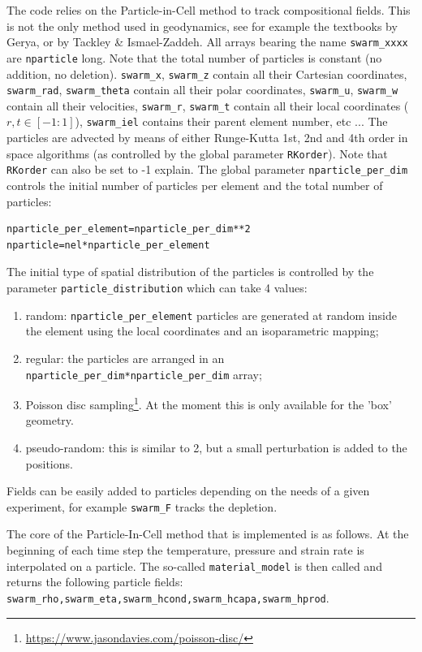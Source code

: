\documentclass[a4paper,12pt]{article}
\begin{document}
The code relies on the Particle-in-Cell method to track compositional fields.
This is not the only method used in geodynamics, see for example 
the textbooks by Gerya, or by Tackley \& Ismael-Zaddeh.
All arrays bearing the name \lstinline{swarm_xxxx} are \lstinline{nparticle} long.
Note that the total number of particles is constant (no addition, no deletion).
\lstinline{swarm_x}, \lstinline{swarm_z} contain all their Cartesian coordinates, 
\lstinline{swarm_rad}, \lstinline{swarm_theta} contain all their polar coordinates, 
\lstinline{swarm_u}, \lstinline{swarm_w} contain all their velocities, 
\lstinline{swarm_r}, \lstinline{swarm_t} contain all their local coordinates ($r,t\in[-1:1]$),
\lstinline{swarm_iel} contains their parent element number, etc ...
The particles are advected by means of either Runge-Kutta 1st, 2nd and 4th order in space
algorithms (as controlled by the global parameter \lstinline{RKorder}).
Note that \lstinline{RKorder} can also be set to -1 {\color{red} explain}.
The global parameter \lstinline{nparticle_per_dim} controls the initial number 
of particles per element and the total number of particles:
\begin{lstlisting}
nparticle_per_element=nparticle_per_dim**2
nparticle=nel*nparticle_per_element
\end{lstlisting}
The initial type of spatial distribution of the particles is controlled 
by the parameter \lstinline{particle_distribution} which can take 4 
values: 
\begin{enumerate}
\item random: \lstinline{nparticle_per_element} particles are generated at random inside the element
using the local coordinates and an isoparametric mapping; 
\item regular: the particles are arranged in an \lstinline{nparticle_per_dim*nparticle_per_dim} array;
\item Poisson disc sampling\footnote{\url{https://www.jasondavies.com/poisson-disc/}}. At the moment this is only 
available for the 'box' geometry.
\item pseudo-random: this is similar to 2, but a small perturbation is added to the positions.
\end{enumerate}

Fields can be easily added to particles depending on the needs of a given experiment, for example 
\lstinline{swarm_F} tracks the depletion.

The core of the Particle-In-Cell method that is implemented is as follows. 
At the beginning of each time step the temperature, pressure and strain rate 
is interpolated on a particle.
The so-called \lstinline{material_model} is then called and returns the following 
particle fields: \lstinline{swarm_rho,swarm_eta,swarm_hcond,swarm_hcapa,swarm_hprod}.
\end{document}
